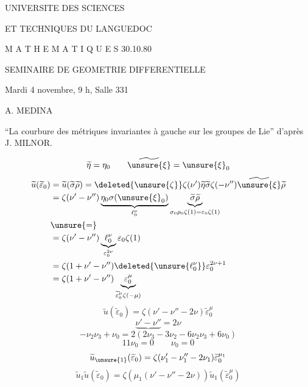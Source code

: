 
UNIVERSITE DES SCIENCES

ET TECHNIQUES DU LANGUEDOC

M A T H E M A T I Q U E S \hfill 30.10.80

\begin{center}
SEMINAIRE DE GEOMETRIE DIFFERENTIELLE

Mardi 4 novembre, 9 h, Salle 331

A. MEDINA
\end{center}

``La courbure des métriques invariantes à gauche sur les groupes de Lie'' d'après J. MILNOR.

\[
\widetilde\eta=\eta_0\qquad \widetilde{\unsure{\xi}}=\unsure{\xi}_0
\]
\[
\begin{aligned}
\widetilde u(\widetilde\varepsilon_0)
 &=\widetilde u(\widetilde\sigma\widetilde\rho)
 =\deleted{\unsure{\zeta}}\zeta(\nu')\widetilde\eta\widetilde\sigma
   \zeta(-\nu'')\widetilde{\unsure{\xi}}\widetilde\rho\\
 &=\zeta(\nu'-\nu'')
   \underbrace{\eta_0\sigma(\unsure{\xi}_0)}_{\ell_0^\nu}
   \underbrace{\widetilde\sigma\widetilde\rho}
     _{\sigma_0\rho_0\zeta(1)=\varepsilon_0\zeta(1)}\\
 &\unsure{=}\\
 &=\zeta(\nu'-\nu'')
    \underbrace{\ell_0^\nu}_{\varepsilon_0^{2\nu}}
      \varepsilon_0\zeta(1)\\
 &=\zeta(1+\nu'-\nu'')\deleted{\unsure{\ell_0^\nu}}
       \varepsilon_0^{2\nu+1}\\
 &=\zeta(1+\nu'-\nu'')
   \underbrace{\varepsilon_0^\mu}_{\widetilde\varepsilon_0^\mu\zeta(-\mu)}
\end{aligned}
\]
\[
\boxed{\widetilde u(\widetilde\varepsilon_0)
 =\zeta(\nu'-\nu''-2\nu)\widetilde\varepsilon_0^\mu}
\]
\[
\underbrace{\nu'-\nu''}=2\nu
\]
\[
-\nu_2\nu_3+\nu_0=2(2\nu_3-3\nu_2-6\nu_2\nu_3+6\nu_0)
\]
\[
11\nu_0=0\qquad \nu_0=0
\]
\[
\widetilde u_{\unsure{1}}(\widetilde\varepsilon_0)
 =\zeta(\nu'_1-\nu''_1-2\nu_1)\widetilde\varepsilon_0^{\mu_1}
\]
\[
\widetilde u_1\widetilde u(\widetilde\varepsilon_0)
 =\zeta(\mu_1(\nu'-\nu''-2\nu))
    \widetilde u_1(\widetilde\varepsilon_0^\mu)
\]

